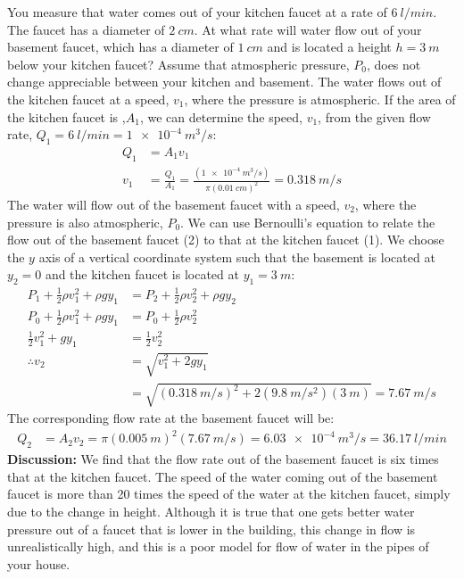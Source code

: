 {{\begin{example}{You measure that water comes out of your kitchen faucet at a rate of $\SI{6}{l/min}$. The faucet has a diameter of $\SI{2}{cm}$. At what rate will water flow out of your basement faucet, which has a diameter of $\SI{1}{cm}$ and is located a height $h=\SI{3}{m}$ below your kitchen faucet? Assume that atmospheric pressure, $P_0$, does not change appreciable between your kitchen and basement.}
\label{ex:fluidmechanics:kitchen}
The water flows out of the kitchen faucet at a speed, $v_1$, where the pressure is atmospheric. If the area of the kitchen faucet is ,$A_1$, we can determine the speed, $v_1$, from the given flow rate, $Q_1=\SI{6}{l/min}=\SI{1e-4}{m^3/s}$:
\begin{align*}
Q_1 &= A_1 v_1\\
v_1 &= \frac{Q_1}{A_1}=\frac{(\SI{1e-4}{m^3/s})}{\pi (\SI{0.01}{cm})^2}=\SI{0.318}{m/s}
\end{align*}
The water will flow out of the basement faucet with a speed, $v_2$, where the pressure is also atmospheric, $P_0$. We can use Bernoulli's equation to relate the flow out of the basement faucet (2) to that at the kitchen faucet (1). We choose the $y$ axis of a vertical coordinate system such that the basement is located at $y_2=0$ and the kitchen faucet is located at $y_1=\SI{3}{m}$:
\begin{align*}
P_1 +\frac{1}{2}\rho v_1^2+ \rho g y_1&= P_2 + \frac{1}{2}\rho v_2^2 + \rho g y_2\\
P_0+\frac{1}{2}\rho v_1^2+ \rho g y_1&= P_0 + \frac{1}{2}\rho v_2^2 \\
\frac{1}{2} v_1^2+  gy_1&=  \frac{1}{2} v_2^2 \\
\therefore v_2 &= \sqrt{v_1^2 + 2gy_1}\\
&=\sqrt{(\SI{0.318}{m/s})^2+2(\SI{9.8}{m/s^2})(\SI{3}{m})}=\SI{7.67}{m/s}
\end{align*}
The corresponding flow rate at the basement faucet will be:
\begin{align*}
Q_2 &= A_2 v_2 = \pi(\SI{0.005}{m})^2(\SI{7.67}{m/s})=\SI{6.03e-4}{m^3/s}=\SI{36.17}{l/min}
\end{align*}
\textbf{Discussion:} We find that the flow rate out of the basement faucet is six times that at the kitchen faucet. The speed of the water coming out of the basement faucet is more than 20 times the speed of the water at the kitchen faucet, simply due to the change in height. Although it is true that one gets better water pressure out of a faucet that is lower in the building, this change in flow is unrealistically high, and this is a poor model for flow of water in the pipes of your house.


\end{example}}}
